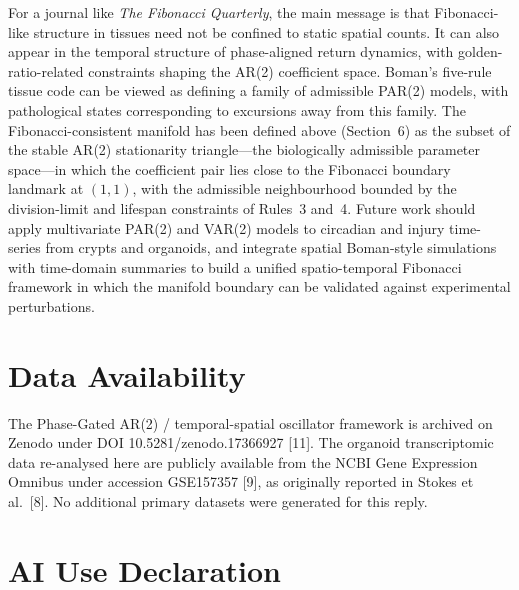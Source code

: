 \documentclass[]{interact}
\begin{document}
For a journal like \emph{The Fibonacci Quarterly}, the main message is that
Fibonacci-like structure in tissues need not be confined to static spatial
counts.
It can also appear in the temporal structure of phase-aligned return dynamics,
with golden-ratio-related constraints shaping the AR(2) coefficient space.
Boman's five-rule tissue code can be viewed as defining a family of admissible
PAR(2) models, with pathological states corresponding to excursions away from
this family.
The Fibonacci-consistent manifold has been defined above (Section~6) as the
subset of the stable AR(2) stationarity triangle---the biologically admissible
parameter space---in which the coefficient pair lies close to the Fibonacci
boundary landmark at $(1,1)$, with the admissible neighbourhood bounded by the
division-limit and lifespan constraints of Rules~3 and~4.
Future work should apply multivariate PAR(2) and VAR(2) models to circadian and
injury time-series from crypts and organoids, and integrate spatial Boman-style
simulations with time-domain summaries to build a unified spatio-temporal
Fibonacci framework in which the manifold boundary can be validated against
experimental perturbations.

\section{Data Availability}

The Phase-Gated AR(2) / temporal-spatial oscillator framework is archived on
Zenodo under DOI 10.5281/zenodo.17366927 [11].
The organoid transcriptomic data re-analysed here are publicly available from
the NCBI Gene Expression Omnibus under accession GSE157357 [9], as originally
reported in Stokes et al.\ [8].
No additional primary datasets were generated for this reply.

\section{AI Use Declaration}
\end{document}
